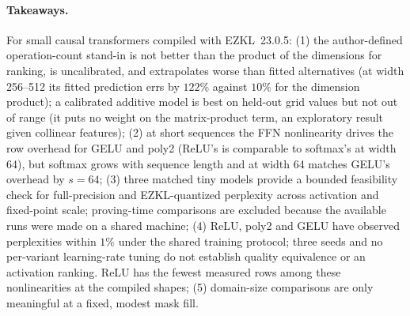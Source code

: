 \documentclass[10pt]{article}
\begin{document}
\paragraph{Takeaways.}
For small causal transformers compiled with EZKL~23.0.5: (1) the
author-defined operation-count stand-in is not better than the product of the dimensions for
ranking, is uncalibrated, and extrapolates worse than fitted alternatives (at width 256--512 its fitted
prediction errs by $122\%$ against $10\%$ for the dimension product); a
calibrated additive model is best on held-out grid values but not out of range
(it puts no weight on the matrix-product term, an exploratory result given
collinear features); (2) at short sequences the FFN nonlinearity drives the row
overhead for GELU and poly2 (ReLU's is comparable to softmax's at width 64), but softmax grows with sequence length and at
width 64 matches GELU's overhead by $s{=}64$; (3) three matched tiny models
provide a bounded feasibility check for full-precision and EZKL-quantized
perplexity across activation and fixed-point scale; proving-time comparisons are excluded because the
available runs were made on a shared machine; (4) ReLU,
poly2 and GELU have observed perplexities within $1\%$ under the shared training
protocol; three seeds and no per-variant learning-rate tuning do not establish
quality equivalence or an activation ranking. ReLU has the fewest measured
rows among these nonlinearities at the compiled shapes;
(5) domain-size comparisons are only meaningful at a fixed,
modest mask fill.
\end{document}
